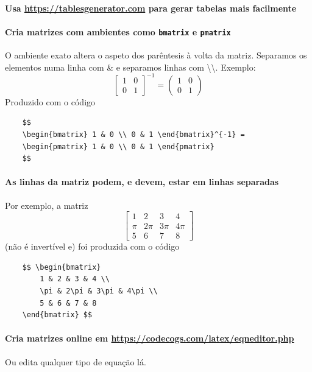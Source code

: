 \documentclass[11pt]{article}
\begin{document}
\paragraph{Usa \url{https://tablesgenerator.com} para gerar tabelas mais facilmente}

\paragraph{Cria matrizes com ambientes como \texttt{bmatrix} e \texttt{pmatrix}}
O ambiente exato altera o aspeto dos parêntesis à volta da matriz.
Separamos os elementos numa linha com \& e separamos linhas com
\textbackslash\textbackslash.
Exemplo:
$$
\begin{bmatrix} 1 & 0 \\ 0 & 1 \end{bmatrix}^{-1} = 
\begin{pmatrix} 1 & 0 \\ 0 & 1 \end{pmatrix}
$$
Produzido com o código
\begin{verbatim}
    $$
    \begin{bmatrix} 1 & 0 \\ 0 & 1 \end{bmatrix}^{-1} = 
    \begin{pmatrix} 1 & 0 \\ 0 & 1 \end{pmatrix}
    $$
\end{verbatim}

\paragraph{As linhas da matriz podem, e devem, estar em linhas separadas}
Por exemplo, a matriz
$$ \begin{bmatrix}
    1 & 2 & 3 & 4 \\
    \pi & 2\pi & 3\pi & 4\pi \\
    5 & 6 & 7 & 8
\end{bmatrix} $$
(não é invertível e) foi produzida com o código
\begin{verbatim}
    $$ \begin{bmatrix}
        1 & 2 & 3 & 4 \\
        \pi & 2\pi & 3\pi & 4\pi \\
        5 & 6 & 7 & 8
    \end{bmatrix} $$
\end{verbatim}

\paragraph{Cria matrizes online em \url{https://codecogs.com/latex/eqneditor.php}}
Ou edita qualquer tipo de equação lá.
\end{document}
